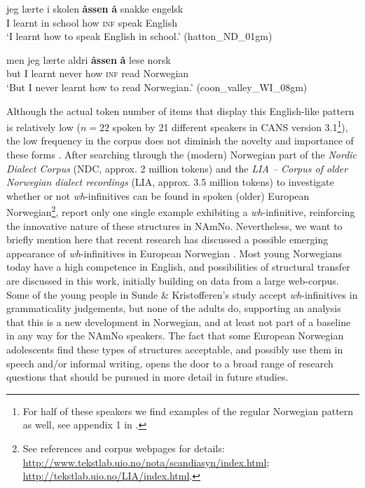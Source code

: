 \documentclass[output=paper,colorlinks,citecolor=brown]{langscibook}
\begin{document}
\begin{exe} 

\item \label{firstamno}

\begin{xlist}


\item \label{first1} \gll jeg l{\ae}rte i skolen \textbf{{\aa}ssen} \textbf{{\aa}} snakke engelsk \\
        I learnt in school how \textsc{inf} speak English \\
         \glt `I learnt how to speak English in school.' \hfill(hatton\_ND\_01gm)

\item \label{first2} \gll men jeg lærte aldri \textbf{{\aa}ssen} \textbf{{\aa}} lese norsk \\
        but I learnt never how \textsc{inf} read Norwegian \\
         \glt `But I never learnt how to read Norwegian.' \hfill(coon\_valley\_WI\_08gm)

\end{xlist}
\end{exe}

Although the actual token number of items that display this English-like pattern is relatively low ($n=22$ spoken by 21 different speakers in CANS version 3.1\footnote{For half of these speakers we find examples of the regular Norwegian pattern as well, see appendix 1 in \citet{putsoft23}.}), the low frequency in the corpus does not diminish the novelty and importance of these forms \citep{roberta21}. After searching through the (modern) Norwegian part of the \textit{Nordic Dialect Corpus} (NDC, approx. 2 million tokens) and the \textit{LIA -- Corpus of older Norwegian dialect recordings} (LIA, approx. 3.5 million tokens) to investigate whether or not \textit{wh}-infinitives can be found in spoken (older) European Norwegian\footnote{See references and corpus webpages for details:  \citet{NDC} \url{http://www.tekstlab.uio.no/nota/scandiasyn/index.html}; \citet{LIAcorpus} \url{http://tekstlab.uio.no/LIA/index.html}.}, \citet{putsoft23} report only one single example exhibiting a \textit{wh}-infinitive, reinforcing the innovative nature of these structures in NAmNo. Nevertheless, we want to briefly mention here that recent research has discussed a possible emerging appearance of \textit{wh}-infinitives in European Norwegian \citep{sundekris2018}. Most young Norwegians today have a high competence in English, and possibilities of structural transfer are discussed in this work, initially building on data from a large web-corpus. Some of the young people in Sunde \& Kristofferen's study accept \textit{wh}-infinitives in grammaticality judgements, but none of the adults do, supporting an analysis that this is a new development in Norwegian, and at least not part of a baseline in any way for the NAmNo speakers. The fact that some European Norwegian adolescents find these types of structures acceptable, and possibly use them in speech and/or informal writing, opens the door to a broad range of research questions that should be pursued in more detail in future studies.
\end{document}
